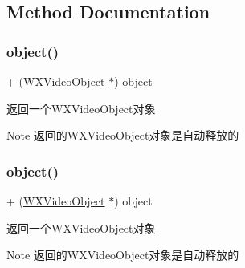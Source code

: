 \subsection{Method Documentation}
\mbox{\label{interface_w_x_video_object_a096b36e4ee7e9f683f8b131d40f9bd6a}} 
\subsubsection{\texorpdfstring{object()}{object()}\hspace{0.1cm}{\footnotesize\ttfamily [1/3]}}
{\footnotesize\ttfamily + (\mbox{\hyperlink{interface_w_x_video_object}{W\+X\+Video\+Object}} $\ast$) object \begin{DoxyParamCaption}{ }\end{DoxyParamCaption}}



返回一个\+W\+X\+Video\+Object对象 

\begin{DoxyNote}{Note}
返回的\+W\+X\+Video\+Object对象是自动释放的 
\end{DoxyNote}
\mbox{\label{interface_w_x_video_object_a096b36e4ee7e9f683f8b131d40f9bd6a}} 
\subsubsection{\texorpdfstring{object()}{object()}\hspace{0.1cm}{\footnotesize\ttfamily [2/3]}}
{\footnotesize\ttfamily + (\mbox{\hyperlink{interface_w_x_video_object}{W\+X\+Video\+Object}} $\ast$) object \begin{DoxyParamCaption}{ }\end{DoxyParamCaption}}



返回一个\+W\+X\+Video\+Object对象 

\begin{DoxyNote}{Note}
返回的\+W\+X\+Video\+Object对象是自动释放的 
\end{DoxyNote}
\mbox{\label{interface_w_x_video_object_a096b36e4ee7e9f683f8b131d40f9bd6a}} 
